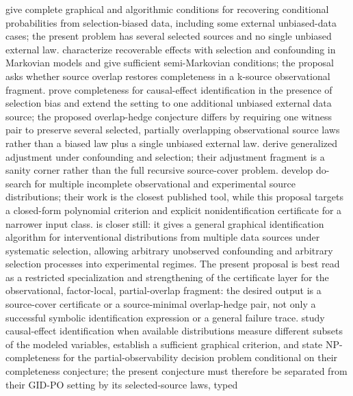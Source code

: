 \documentclass[11pt]{article}
\theoremstyle{definition}
\theoremstyle{plain}
\theoremstyle{remark}
\begin{document}
\citet{BareinboimTianPearl2014Selection} give complete graphical and
algorithmic conditions for recovering conditional probabilities from
selection-biased data, including some external unbiased-data cases; the
present problem has several selected sources and no single unbiased external
law.  \citet{BareinboimTian2015RecoveringEffects} characterize recoverable
effects with selection and confounding in Markovian models and give sufficient
semi-Markovian conditions; the proposal asks whether source overlap restores
completeness in a k-source observational fragment.
\citet{CorreaTianBareinboim2019SelectionEffects} prove completeness for
causal-effect identification in the presence of selection bias and extend the
setting to one additional unbiased external data source; the proposed
overlap-hedge conjecture differs by requiring one witness pair to preserve
several selected, partially overlapping observational source laws rather than
a biased law plus a single unbiased external law.  \citet{CorreaTianBareinboim2018Adjustment}
derive generalized adjustment under confounding and selection; their
adjustment fragment is a sanity corner rather than the full recursive
source-cover problem.  \citet{TikkaHyttinenKarvanen2021DoSearch} develop
do-search for multiple incomplete observational and experimental source
distributions; their work is the closest published tool, while this proposal
targets a closed-form polynomial criterion and explicit nonidentification
certificate for a narrower input class.  \citet{LeeGhassamiShpitser2024DataFusionSelection}
is closer still: it gives a general graphical identification algorithm for
interventional distributions from multiple data sources under systematic
selection, allowing arbitrary unobserved confounding and arbitrary selection
processes into experimental regimes.  The present proposal is best read as a
restricted specialization and strengthening of the certificate layer for the
observational, factor-local, partial-overlap fragment: the desired output is a
source-cover certificate or a source-minimal overlap-hedge pair, not only a
successful symbolic identification expression or a general failure trace.
\citet{LeeBareinboim2020PartialObservability} study causal-effect
identification when available distributions measure different subsets of the
modeled variables, establish a sufficient graphical criterion, and state
NP-completeness for the partial-observability decision problem conditional on
their completeness conjecture; the present conjecture must therefore be
separated from their GID-PO setting by its selected-source laws, typed
\end{document}
